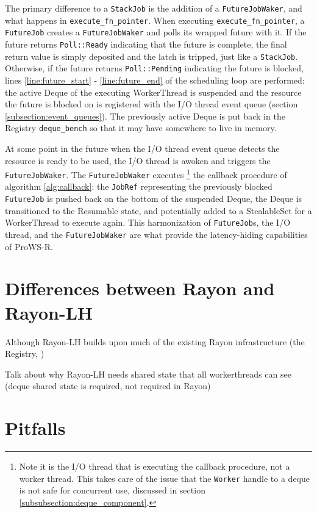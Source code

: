 \documentclass[bsc,frontabs,singlespacing,parskip,deptreport,normalheadings]{infthesis}
\begin{document}
The primary difference to a \texttt{StackJob} is the addition of a
\texttt{FutureJobWaker}, and what happens in \texttt{execute\_fn\_pointer}. When
executing \texttt{execute\_fn\_pointer}, a \texttt{FutureJob} creates a
\texttt{FutureJobWaker} and polls its wrapped future with it. If the future
returns \texttt{Poll::Ready} indicating that the future is complete, the final
return value is simply deposited and the latch is tripped, just like a
\texttt{StackJob}. Otherwise, if the future returns \texttt{Poll::Pending}
indicating the future is blocked, lines \ref{line:future_start} -
\ref{line:future_end} of the scheduling loop are performed: the active Deque of
the executing WorkerThread is suspended and the resource the future is blocked
on is registered with the I/O thread event queue (section
\ref{subsection:event_queues}). The previously active Deque is put back in the
Registry \texttt{deque\_bench} so that it may have somewhere to live in memory.

At some point in the future when the I/O thread event queue detects the resource
is ready to be used, the I/O thread is awoken and triggers the
\texttt{FutureJobWaker}. The \texttt{FutureJobWaker} executes \footnote{Note it
    is the I/O thread that is executing the callback procedure, not a worker
thread. This takes care of the issue that the \texttt{Worker} handle to a deque
is not safe for concurrent use, discussed in section
\ref{subsubsection:deque_component}.} the callback procedure of algorithm
\ref{alg:callback}: the \texttt{JobRef} representing the previously blocked
\texttt{FutureJob} is pushed back on the bottom of the suspended Deque, the
Deque is transitioned to the Resumable state, and potentially added to a
StealableSet for a WorkerThread to execute again. This harmonization of
\texttt{FutureJob}s, the I/O thread, and the \texttt{FutureJobWaker} are what
provide the latency-hiding capabilities of ProWS-R.

\section{Differences between Rayon and Rayon-LH}

Although Rayon-LH builds upon much of the existing Rayon infrastructure (the
Registry, )

Talk about why Rayon-LH needs shared state that all workerthreads can see (deque
shared state is required, not required in Rayon)

\section{Pitfalls}
\end{document}
